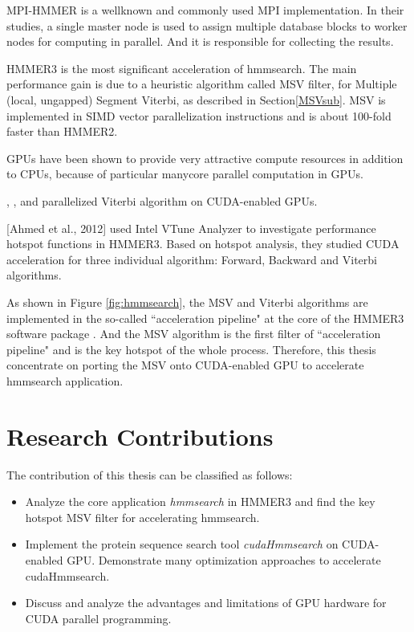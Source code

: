 MPI-HMMER \citep{Walters2006} is a wellknown and commonly used MPI implementation. In their studies, a single master node is used to assign multiple database blocks to worker nodes for computing in parallel. And it is responsible for collecting the results.

HMMER3 \citep{HMMER3} is the most significant acceleration of hmmsearch. The main performance gain is due to a heuristic algorithm called MSV filter, for Multiple (local, ungapped) Segment Viterbi, as described in Section\ref{MSVsub}. MSV is implemented in SIMD vector parallelization instructions and is about 100-fold faster than HMMER2.

GPUs have been shown to provide very attractive compute resources in addition to CPUs, because of particular manycore parallel computation in GPUs.

\citep{GPUHMM}, \citep{Ganesan}, \citep{Du} and \citep{Quirem} parallelized Viterbi algorithm on CUDA-enabled GPUs.

[Ahmed et al., 2012]\citep{Ahmed} used Intel VTune Analyzer \citep{Intel} to investigate performance hotspot functions in HMMER3. Based on hotspot analysis, they studied CUDA acceleration for three individual algorithm: Forward, Backward and Viterbi algorithms.

As shown in Figure \ref{fig:hmmsearch}, the MSV and Viterbi algorithms are implemented in the so-called ``acceleration pipeline" at the core of the HMMER3 software package \citep{HMMER3}. And the MSV algorithm is the first filter of ``acceleration pipeline" and is the key hotspot of the whole process. Therefore, this thesis concentrate on porting the MSV onto CUDA-enabled GPU to accelerate hmmsearch application.

\section{Research Contributions}
The contribution of this thesis can be classified as follows:
\begin{itemize}
 \item Analyze the core application \emph{hmmsearch} in HMMER3 and find the key hotspot MSV filter for accelerating hmmsearch.
 \item Implement the protein sequence search tool \emph{cudaHmmsearch} on CUDA-enabled GPU. Demonstrate many optimization approaches to accelerate cudaHmmsearch.
 \item Discuss and analyze the advantages and limitations of GPU hardware for CUDA parallel programming.
\end{itemize}

